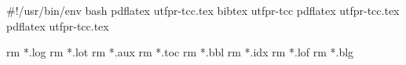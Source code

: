 #!/usr/bin/env bash
pdflatex utfpr-tcc.tex
bibtex utfpr-tcc
pdflatex utfpr-tcc.tex
pdflatex utfpr-tcc.tex

rm *.log 
rm *.lot 
rm *.aux 
rm *.toc
rm *.bbl
rm *.idx
rm *.lof
rm *.blg
